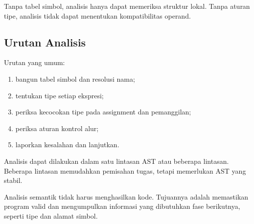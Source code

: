 Tanpa tabel simbol, analisis hanya dapat memeriksa struktur lokal.
Tanpa aturan tipe, analisis tidak dapat menentukan kompatibilitas
operand.

\subsection{Urutan Analisis}

Urutan yang umum:
\begin{enumerate}[label=\arabic*.,leftmargin=*]
  \item bangun tabel simbol dan resolusi nama;
  \item tentukan tipe setiap ekspresi;
  \item periksa kecocokan tipe pada assignment dan pemanggilan;
  \item periksa aturan kontrol alur;
  \item laporkan kesalahan dan lanjutkan.
\end{enumerate}

Analisis dapat dilakukan dalam satu lintasan AST atau beberapa
lintasan. Beberapa lintasan memudahkan pemisahan tugas, tetapi
memerlukan AST yang stabil.

\begin{infobox}
Analisis semantik tidak harus menghasilkan kode. Tujuannya adalah
memastikan program valid dan mengumpulkan informasi yang dibutuhkan
fase berikutnya, seperti tipe dan alamat simbol.
\end{infobox}
